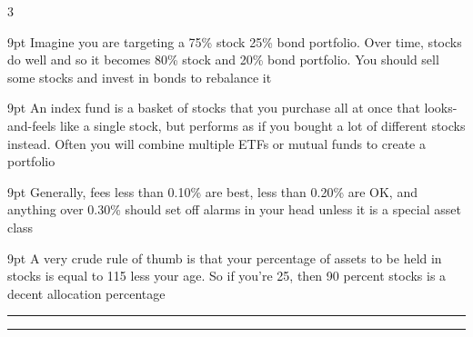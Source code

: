 \documentclass[landscape]{article}
\newcommand{\myline}{\vspace{4pt}\hrule  \vspace{4pt}}
\newenvironment{topic}[1]{
	\noindent \textbf{\textsc{\color{harvardcrimson}{#1}}}
	\noindent \hspace{-3.5pt}
}{
	\myline
}
\newenvironment{prin}[1]{
	\noindent \textit{\color{black}{#1}}
	\begin{adjustwidth}{9pt}{}
		\color{dark-grey}
	}{
	\end{adjustwidth}
}
\begin{document}
\begin{multicols*}{3}
\begin{topic}{Investing Principals}
		\begin{prin}{Principal I\princount: The Principal of Rebalancing: As time goes on, your portfolio will become ``unbalanced''. You should keep an eye out for this and correct it if it drifts too far} Imagine you are targeting a 75\% stock 25\% bond portfolio. Over time, stocks do well and so it becomes 80\% stock and 20\% bond portfolio. You should sell some stocks and invest in bonds to rebalance it \end{prin}
		\begin{prin}{Principal I\princount: The Principal of Index Funds: Index funds (especially ETFs) can provide a great mix of assets for reasonable costs} An index fund is a basket of stocks that you purchase all at once that looks-and-feels like a single stock, but performs as if you bought a lot of different stocks instead. Often you will combine multiple ETFs or mutual funds to create a portfolio \end{prin}
		\begin{prin}{Principal I\princount: The Principal of Fees: Watch out for fees anytime that you purchase a mutual fund or index fund - they can eat alive your return} Generally, fees less than 0.10\% are best, less than 0.20\% are OK, and anything over 0.30\% should set off alarms in your head unless it is a special asset class\end{prin}
		\begin{prin}{Principal I\princount: The Principal of Time: When investing for time periods of $ > $ 10 years, you can afford much riskier allocations than someone who is retiring sooner} A very crude rule of thumb is that your percentage of assets to be held in stocks is equal to 115 less your age. So if you're 25, then 90 percent stocks is a decent allocation percentage\end{prin}
	\end{topic} \resetprincount
	
	
	\begin{topic}{Personal Finance Principals}
	

\end{topic}
\end{multicols*}
\end{document}
